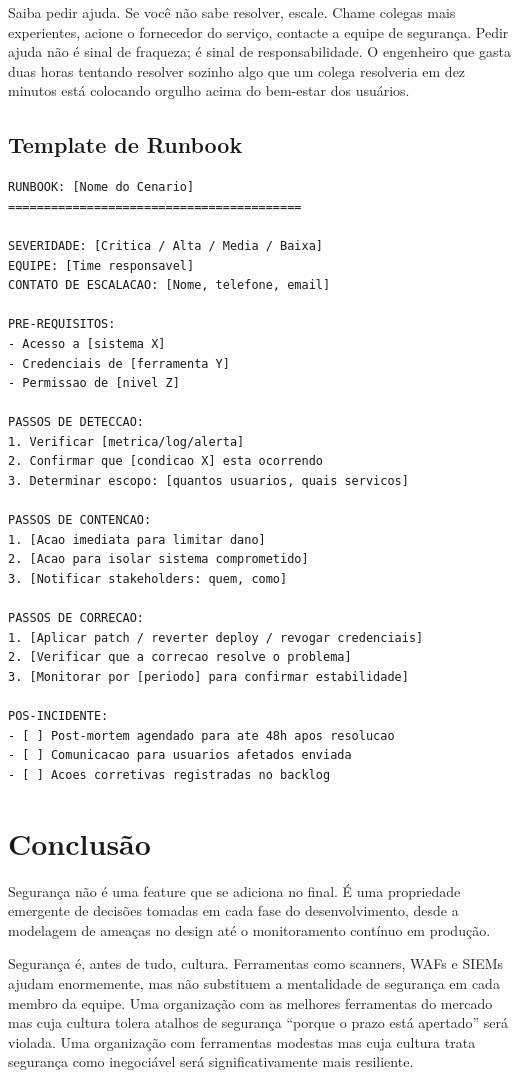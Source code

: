 Saiba pedir ajuda. Se você não sabe resolver, escale. Chame colegas mais
experientes, acione o fornecedor do serviço, contacte a equipe de segurança.
Pedir ajuda não é sinal de fraqueza; é sinal de responsabilidade. O engenheiro
que gasta duas horas tentando resolver sozinho algo que um colega resolveria em
dez minutos está colocando orgulho acima do bem-estar dos usuários.

\subsection{Template de Runbook}

\begin{lstlisting}[language={}, caption={Template de Runbook de Incidente}]
RUNBOOK: [Nome do Cenario]
=========================================

SEVERIDADE: [Critica / Alta / Media / Baixa]
EQUIPE: [Time responsavel]
CONTATO DE ESCALACAO: [Nome, telefone, email]

PRE-REQUISITOS:
- Acesso a [sistema X]
- Credenciais de [ferramenta Y]
- Permissao de [nivel Z]

PASSOS DE DETECCAO:
1. Verificar [metrica/log/alerta]
2. Confirmar que [condicao X] esta ocorrendo
3. Determinar escopo: [quantos usuarios, quais servicos]

PASSOS DE CONTENCAO:
1. [Acao imediata para limitar dano]
2. [Acao para isolar sistema comprometido]
3. [Notificar stakeholders: quem, como]

PASSOS DE CORRECAO:
1. [Aplicar patch / reverter deploy / revogar credenciais]
2. [Verificar que a correcao resolve o problema]
3. [Monitorar por [periodo] para confirmar estabilidade]

POS-INCIDENTE:
- [ ] Post-mortem agendado para ate 48h apos resolucao
- [ ] Comunicacao para usuarios afetados enviada
- [ ] Acoes corretivas registradas no backlog
\end{lstlisting}

\section{Conclusão}

Segurança não é uma feature que se adiciona no final. É uma propriedade emergente
de decisões tomadas em cada fase do desenvolvimento, desde a modelagem de
ameaças no design até o monitoramento contínuo em produção.

Segurança é, antes de tudo, cultura. Ferramentas como scanners, WAFs e SIEMs
ajudam enormemente, mas não substituem a mentalidade de segurança em cada membro
da equipe. Uma organização com as melhores ferramentas do mercado mas cuja
cultura tolera atalhos de segurança ``porque o prazo está apertado'' será
violada. Uma organização com ferramentas modestas mas cuja cultura trata
segurança como inegociável será significativamente mais resiliente.

